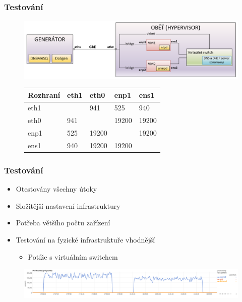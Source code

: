 \documentclass[%
  12pt,       				%
	t,                  %
	aspectratio=1610,   %
	unicode,						%
czech,              %
]{beamer}				    	%
\begin{document}
\begin{frame}
\frametitle{Testování}
\begin{figure}%
	\centering
	\vspace{0.4cm}	              %
	\includegraphics[width=0.659\columnwidth]{obrazky/lab_schema.png}
	\begin{table}[ht]
		\centering
		\label{tab:troughput-lab-interfaces}
		\begin{tabular}{|l|l|l|l|l|}
			\hline
			Rozhraní & eth1 & eth0  & enp1  & ens1  \\ \hline
			eth1     &      & 941   & 525   & 940   \\ \hline
			eth0     & 941  &       & 19200 & 19200 \\ \hline
			enp1     & 525  & 19200 &       & 19200 \\ \hline
			ens1     & 940  & 19200 & 19200 &       \\ \hline
		\end{tabular}
	\end{table}
\end{figure}
\end{frame}


\begin{frame}
\frametitle{Testování}
\begin{itemize}
	\item Otestovány všechny útoky
	\item Složitější nastavení infrastruktury
	\item Potřeba většího počtu zařízení
	\item Testování na fyzické infrastruktuře vhodnější
	\begin{itemize}
		\item Potíže s virtuálním switchem
	\end{itemize}
\end{itemize}

\begin{figure}%
	\centering
	\vspace{0.4cm}	              %
	\includegraphics[width=0.92\columnwidth]{obrazky/grafy/graph_ntp_traffic_5ampl_vs6ampl.png}
\end{figure}
\end{frame}
\end{document}
